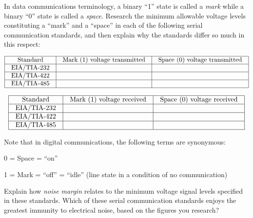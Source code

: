 

In data communications terminology, a binary ``1'' state is called a {\it mark} while a binary ``0'' state is called a {\it space}.  Research the minimum allowable voltage levels constituting a ``mark'' and a ``space'' in each of the following serial communication standards, and then explain why the standards differ so much in this respect:


$$\vbox{\offinterlineskip
\halign{\strut
\vrule \quad\hfil # \ \hfil & 
\vrule \quad\hfil # \ \hfil & 
\vrule \quad\hfil # \ \hfil \vrule \cr
\noalign{\hrule}
%
Standard & Mark (1) voltage transmitted & Space (0) voltage transmitted \cr
%
\noalign{\hrule}
%
EIA/TIA-232 &  &  \cr
%
\noalign{\hrule}
%
EIA/TIA-422 &  &  \cr
%
\noalign{\hrule}
%
EIA/TIA-485 &  &  \cr
%
\noalign{\hrule}
} %
}$$ %



$$\vbox{\offinterlineskip
\halign{\strut
\vrule \quad\hfil # \ \hfil & 
\vrule \quad\hfil # \ \hfil & 
\vrule \quad\hfil # \ \hfil \vrule \cr
\noalign{\hrule}
%
Standard & Mark (1) voltage received & Space (0) voltage received \cr
%
\noalign{\hrule}
%
EIA/TIA-232 &  &  \cr
%
\noalign{\hrule}
%
EIA/TIA-422 &  &  \cr
%
\noalign{\hrule}
%
EIA/TIA-485 &  &  \cr
%
\noalign{\hrule}
} %
}$$ %


\vskip 10pt

\noindent
Note that in digital communications, the following terms are synonymous:

\vskip 10pt

0 = Space = ``on''

\vskip 10pt

1 = Mark = ``off'' = ``idle'' (line state in a condition of no communication)

\vskip 10pt

Explain how {\it noise margin} relates to the minimum voltage signal levels specified in these standards.  Which of these serial communication standards enjoys the greatest immunity to electrical noise, based on the figures you research?



